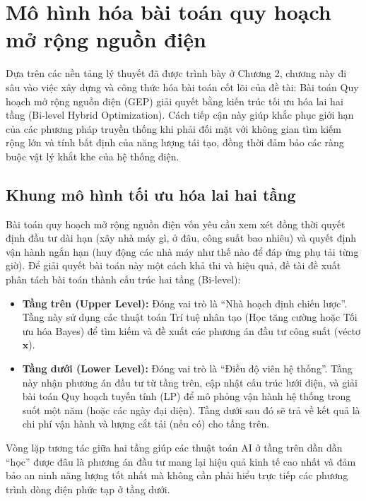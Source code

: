 \chapter{Mô hình hóa bài toán quy hoạch mở rộng nguồn điện}
\label{chap:problem-modeling}

Dựa trên các nền tảng lý thuyết đã được trình bày ở Chương 2, chương này đi sâu vào việc xây dựng và công thức hóa bài toán cốt lõi của đề tài: Bài toán Quy hoạch mở rộng nguồn điện (GEP) giải quyết bằng kiến trúc tối ưu hóa lai hai tầng (Bi-level Hybrid Optimization). Cách tiếp cận này giúp khắc phục giới hạn của các phương pháp truyền thống khi phải đối mặt với không gian tìm kiếm rộng lớn và tính bất định của năng lượng tái tạo, đồng thời đảm bảo các ràng buộc vật lý khắt khe của hệ thống điện.

\section{Khung mô hình tối ưu hóa lai hai tầng}

Bài toán quy hoạch mở rộng nguồn điện vốn yêu cầu xem xét đồng thời quyết định đầu tư dài hạn (xây nhà máy gì, ở đâu, công suất bao nhiêu) và quyết định vận hành ngắn hạn (huy động các nhà máy như thế nào để đáp ứng phụ tải từng giờ). Để giải quyết bài toán này một cách khả thi và hiệu quả, đề tài đề xuất phân tách bài toán thành cấu trúc hai tầng (Bi-level):

\begin{itemize}
    \item \textbf{Tầng trên (Upper Level):} Đóng vai trò là ``Nhà hoạch định chiến lược''. Tầng này sử dụng các thuật toán Trí tuệ nhân tạo (Học tăng cường hoặc Tối ưu hóa Bayes) để tìm kiếm và đề xuất các phương án đầu tư công suất (véctơ $\mathbf{x}$).
    \item \textbf{Tầng dưới (Lower Level):} Đóng vai trò là ``Điều độ viên hệ thống''. Tầng này nhận phương án đầu tư từ tầng trên, cập nhật cấu trúc lưới điện, và giải bài toán Quy hoạch tuyến tính (LP) để mô phỏng vận hành hệ thống trong suốt một năm (hoặc các ngày đại diện). Tầng dưới sau đó sẽ trả về kết quả là chi phí vận hành và lượng cắt tải (nếu có) cho tầng trên.
\end{itemize}

Vòng lặp tương tác giữa hai tầng giúp các thuật toán AI ở tầng trên dần dần ``học'' được đâu là phương án đầu tư mang lại hiệu quả kinh tế cao nhất và đảm bảo an ninh năng lượng tốt nhất mà không cần phải hiểu trực tiếp các phương trình dòng điện phức tạp ở tầng dưới.

